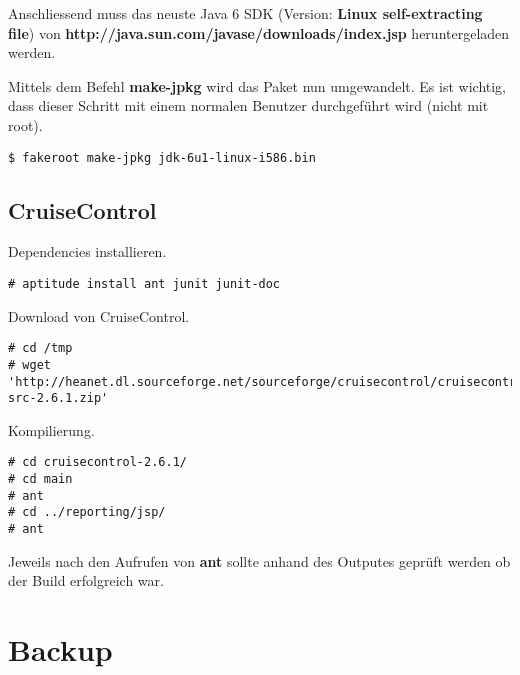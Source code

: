 \documentclass[a4paper,12pt,halfparskip,DIV14]{scrreprt}
\begin{document}
Anschliessend muss das neuste Java 6 SDK (Version: \textbf{Linux self-extracting file}) von \textbf{http://java.sun.com/javase/downloads/index.jsp} heruntergeladen werden.


Mittels dem Befehl \textbf{make-jpkg} wird das Paket nun umgewandelt. Es ist wichtig, dass dieser Schritt mit einem normalen Benutzer durchgeführt wird (nicht mit root).

\begin{verbatim}
$ fakeroot make-jpkg jdk-6u1-linux-i586.bin 
\end{verbatim}


\section{CruiseControl} %
\label{sec:cruisecontrol}

Dependencies installieren.

\begin{verbatim}
# aptitude install ant junit junit-doc
\end{verbatim}

Download von CruiseControl.

\begin{verbatim}
# cd /tmp
# wget 'http://heanet.dl.sourceforge.net/sourceforge/cruisecontrol/cruisecontrol-src-2.6.1.zip'
\end{verbatim}

Kompilierung.

\begin{verbatim}
# cd cruisecontrol-2.6.1/
# cd main
# ant
# cd ../reporting/jsp/
# ant
\end{verbatim}

Jeweils nach den Aufrufen von \textbf{ant} sollte anhand des Outputes geprüft werden ob der Build erfolgreich war.




\chapter{Backup} %
\label{cha:backup}

\end{document}
